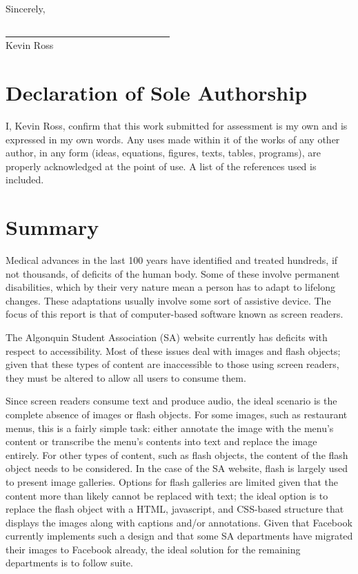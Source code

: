 \documentclass[]{article}
\begin{document}
Sincerely,

\underline{~~~~~~~~~~~~~~~~~~~~~~~~~~~~~~~~~~}\\Kevin Ross \clearpage
\def\pschool{Algonquin College}
\def\pdepartment{School of Advanced Technology} 
\def\ppreppedfor{Carolyn Côté} \def\pcoursecode{ENL1819}

\clearpage

\section{Declaration of Sole
Authorship}\label{declaration-of-sole-authorship}

I, Kevin Ross, confirm that this work submitted for assessment is my own
and is expressed in my own words. Any uses made within it of the works
of any other author, in any form (ideas, equations, figures, texts,
tables, programs), are properly acknowledged at the point of use. A list
of the references used is included.

\clearpage

\section{Summary}\label{summary}

Medical advances in the last 100 years have identified and treated
hundreds, if not thousands, of deficits of the human body. Some of these
involve permanent disabilities, which by their very nature mean a person
has to adapt to lifelong changes. These adaptations usually involve some
sort of assistive device. The focus of this report is that of
computer-based software known as screen readers.

The Algonquin Student Association (SA) website currently has deficits
with respect to accessibility. Most of these issues deal with images and
flash objects; given that these types of content are inaccessible to
those using screen readers, they must be altered to allow all users to
consume them.

Since screen readers consume text and produce audio, the ideal scenario
is the complete absence of images or flash objects. For some images,
such as restaurant menus, this is a fairly simple task: either annotate
the image with the menu's content or transcribe the menu's contents into
text and replace the image entirely. For other types of content, such as
flash objects, the content of the flash object needs to be considered.
In the case of the SA website, flash is largely used to present image
galleries. Options for flash galleries are limited given that the
content more than likely cannot be replaced with text; the ideal option
is to replace the flash object with a HTML, javascript, and CSS-based
structure that displays the images along with captions and/or
annotations. Given that Facebook currently implements such a design and
that some SA departments have migrated their images to Facebook already,
the ideal solution for the remaining departments is to follow suite.
\end{document}

